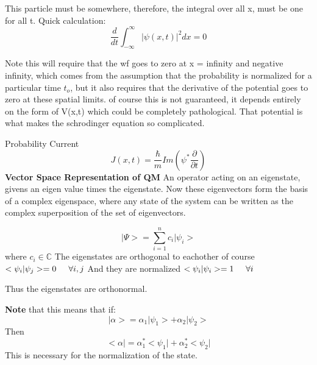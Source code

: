 \documentclass{article}
\begin{document}
This particle must be somewhere, therefore, the integral over all x, must be one for all t. Quick calculation: 
\begin{equation}
\frac{d}{dt}\int_{-\infty}^{\infty}\vert\psi(x,t)\vert^2dx=0
\end{equation}


Note this will require that the wf goes to zero at x = infinity and negative infinity, which comes from the assumption that the probability is normalized for a particular time $t_o$, but it also requires that the derivative of the potential goes to zero at these spatial limits. of course this is not guaranteed, it depends entirely on the form of V(x,t) which could be completely pathological. That potential is what makes the schrodinger equation so complicated.

\vspace{5mm}

Probability Current
\begin{equation}
J(x,t)=\frac{\hbar}{m}Im(\psi^*\frac{\partial}{\partial t})
\end{equation}
\vspace{5mm}
\textbf{Vector Space Representation of QM}
An operator acting on an eigenstate, givens an eigen value times the eigenstate. Now these eigenvectors form the basis of a complex eigenspace, where any state of the system can be written as the complex superposition of the set of eigenvectors. 

\begin{equation}
\vert \Psi > = \sum_{i=1}^nc_i\vert \psi_i>
\end{equation}
where $c_i\in \mathbb{C}$
\vspace{5mm}
The eigenstates are orthogonal to eachother of course\newline
$<\psi_i\vert\psi_j>=0 \hspace{5mm} \forall i,j$
And they are normalized\newline
$<\psi_i\vert\psi_i>=1 \hspace{5mm} \forall i$


Thus the eigenstates are orthonormal. 
\vspace{5mm}

\textbf{Note} that this means that if:
\begin{equation}
\vert\alpha>=\alpha_1\vert\psi_1>+\alpha_2\vert\psi_2>
\end{equation}
Then
\begin{equation}
<\alpha\vert=\alpha_1^*<\psi_1\vert+\alpha_2^*<\psi_2\vert
\end{equation}
This is necessary for the normalization of the state. 
\end{document}
